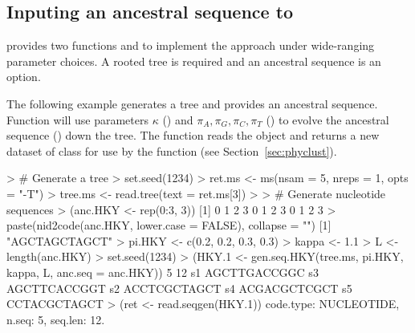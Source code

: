 \subsection[Inputing an ancestral sequence to ms+seqgen]{Inputing an ancestral sequence to }
\label{sec:ancestral}

 provides two functions  and
 to implement the 
approach under wide-ranging parameter choices. A rooted tree is required and an
ancestral sequence is an option.

The following example generates a tree and provides an ancestral
sequence. Function  will use
parameters $\kappa$ () and
$\pi_{A}, \pi_{G}, \pi_{C}, \pi_{T}$ ()
to evolve the ancestral sequence () down the tree.
The function  reads the 
object and returns a new dataset of class 
for use by the function  (see Section~\ref{sec:phyclust}).
\begin{Code}
> # Generate a tree
> set.seed(1234)
> ret.ms <- ms(nsam = 5, nreps = 1, opts = "-T")
> tree.ms <- read.tree(text = ret.ms[3])
> 
> # Generate nucleotide sequences
> (anc.HKY <- rep(0:3, 3))
 [1] 0 1 2 3 0 1 2 3 0 1 2 3
> paste(nid2code(anc.HKY, lower.case = FALSE), collapse = "")
[1] "AGCTAGCTAGCT"
> pi.HKY <- c(0.2, 0.2, 0.3, 0.3)
> kappa <- 1.1
> L <- length(anc.HKY)
> set.seed(1234)
> (HKY.1 <- gen.seq.HKY(tree.ms, pi.HKY, kappa, L, anc.seq = anc.HKY))
 5 12
s1        AGCTTGACCGGC
s3        AGCTTCACCGGT
s2        ACCTCGCTAGCT
s4        ACGACGCTCGCT
s5        CCTACGCTAGCT
> (ret <- read.seqgen(HKY.1))
code.type: NUCLEOTIDE, n.seq: 5, seq.len: 12.
\end{Code}

